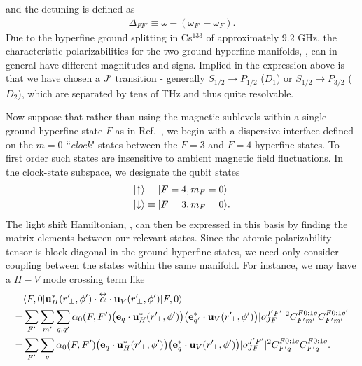 and the detuning is defined as
\begin{align}
	\Delta_{FF'} \equiv \omega - (\omega_{F'} - \omega_{F}).
\end{align}
Due to the hyperfine ground splitting in Cs$^{133}$ of approximately 9.2 GHz, the characteristic 
polarizabilities for the two ground hyperfine manifolds, , can in 
general have different magnitudes and signs.  Implied in the expression above is that we have chosen a 
$J'$ transition - generally $S_{1/2} \rightarrow P_{1/2}$ ($D_1$) or $S_{1/2} \rightarrow P_{3/2}$ ($D_2$), 
which are 
separated by tens of THz and thus quite resolvable.   

Now suppose that rather than using the magnetic sublevels within a single ground hyperfine state $F$ as 
in Ref.~\cite{Deutsch2010a}, we begin with a dispersive interface defined on the $m=0$ ``\emph{clock}" states 
between the $F=3$ and $F=4$ hyperfine states.  To first order such states are insensitive to ambient 
magnetic field fluctuations.  In the clock-state subspace, we designate the qubit states
\begin{align} 
	\lvert{\uparrow}\rangle &\equiv \lvert{F = 4,m_F = 0}\rangle \\
 	\lvert{\downarrow}\rangle &\equiv \lvert{F = 3,m_F=0}\rangle.
\end{align}
The light shift Hamiltonian, , can then be expressed in this basis by finding 
the 
matrix elements between our relevant states.  Since the atomic polarizability tensor is block-diagonal in 
the ground hyperfine states, we need only consider coupling between the states within the same 
manifold.  
For instance, we may have a $H-V$ mode crossing term like
\begin{align} \label{eq:ClockMatrixElement}
	&\bra{F,0} \mathbf{u}^*_H(r^\prime\!_\perp, \phi') \cdot \tensor{\alpha} \cdot 
	\mathbf{u}_{V}(r^\prime\!_\perp, \phi') \ket{F,0}\nonumber\\
  =& 
	\sum_{F'} \sum_{m'} \sum_{q, q'} \alpha_0(F,F') \big( \mathbf{e}_q \cdot 
	\mathbf{u}^*_H(r^\prime\!_\perp, \phi') \big) 
	\big( \mathbf{e}^*_{q'} \cdot \mathbf{u}_V(r^\prime\!_\perp, \phi') \big) |o^{J'F'}_{JF} |^2 C^{F 0;1 
	q}_{F' m'} C^{F 
	0;1q'}_{F' m'} \\
 = & \sum_{F'} \sum_{q} \alpha_0(F,F') \big( \mathbf{e}_q \cdot \mathbf{u}^*_H(r^\prime\!_\perp, \phi') 
	\big) \big( 
	\mathbf{e}^*_{q} \cdot \mathbf{u}_V(r^\prime\!_\perp, \phi') \big) |o^{J'F'}_{JF} |^2 C^{F 0;1q}_{F' q} 
	C^{F 0;1q}_{F' q}.
\end{align}
